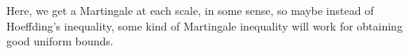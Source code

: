 \documentclass[dvipsnames,letterpaper,12pt]{article}
\numberwithin{equation}{section}
\DeclareMathOperator{\RR}{\mathbb{R}}
\DeclareMathOperator{\ZZ}{\mathbb{Z}}
\numberwithin{theorem}{section}
\DeclareMathOperator{\EE}{\mathbb{E}}
\begin{document}
\begin{comment}
Now the $L^p$ norm of the function
%
\[ N^{-k/p} \left( \sum_{i_1} e^{2 \pi i (M_{i_1} / N) x} \sum_{i_2} e^{2 \pi i (M_{i_1,i_2} / N^2) x} \dots \EE \left( \sum_{i_k} e^{2 \pi i (M_{i_1,\dots,i_k} / N^k) x} a_i \right) \right) \phi(x/N^k) \]
%
is bounded by
%
\[ C \cdot N^{-k/p} D_{k-1} \left( \sum_{i_1,\dots,i_{k-1}} \left\| \EE \left( \sum_{i_k} e^{2 \pi i (M_{i_1,\dots,i_k} / N^k) x} a_i \phi(x/2N) \right) \right\|_{L^p(\RR^d)}^2 \right)^{1/2} \]
%
which assuming $\sum |a_i|^2 = 1$, can be as bad as
%
\[ C \cdot N^{1-1/p} D_{k-1} M^{1/2}. \]
%
s

Now
%
\[ \EE \left[ e^{2 \pi i (M_{i_1,\dots,i_k} / N^k) x} \right] = \frac{1}{N} \sum_{j = 0}^{N-1} e^{2 \pi i (x/N^k) j} = (1/N) \frac{e^{2 \pi i x/N^{k-1}} - 1}{e^{2 \pi i x / N^k} - 1}. \]
%
This quantity becomes small when $d(x, N^{k-1} \ZZ) \lesssim N^{k-1}$, and large (on the scale of $O(1)$) when $x$ nears an integer multiple of $N^k$. Applying Cauchy-Schwartz, we conclude that
%
\[ \EE \left[ \sum_{i_k} e^{2 \pi i (M_{i_1,\dots,i_k} / N^k) x} a_{i_1,\dots,i_k} \right] = \frac{e^{2 \pi i x/N^{k-1}} - 1}{e^{2 \pi i x / N^k} - 1} \cdot \EE \left[ \sum_{i_k} a_{i_1,\dots,i_k} \right]. \]
%
In the worst case then, this expected value can be $O(N M^{1/2})$, and outside a set of total length $O(N^{k-1})$, it is likely to be on the other of $O(M^{1/2})$. Applying Hoeffding's inequality, if
%
\[ S_{i_1,\dots,i_{k-1}} = \sum_{i_k} e^{2 \pi i (M_{i_1,\dots,i_k} / N^k) x} a_{i_1,\dots,i_k}, \]
%
\end{comment}

\begin{comment}
Thus applying a union bound over all $i_1,\dots,i_{k-1}$, $S_{i_1,\dots,i_{k-1}}$ deviates from it's expected value by at most $O(\log M \cdot |a_{i_1,\dots,i_{k-1}}|)$ with high probability. Thus summing over $i_1,\dots,i_{k-1}$, we get a total error of
%
\[ O( \log M \sum_{i_1,\dots,i_{k-1}} |a_{i_1,\dots,i_{k-1}}| ) \]

we get that for each $i_1,\dots,i_{k-1}$,
%
\[ \| \sum_{i_k} e^{2 \pi i (M_{i_1,\dots,i_k} / N^k) x} a_{i_1,\dots,i_k} - \EE[] \|_{\psi_2} \lesssim \left( \sum \right)^{1/2} \]
\end{comment}


Here, we get a Martingale at each scale, in some sense, so maybe instead of Hoeffding's inequality, some kind of Martingale inequality will work for obtaining good uniform bounds.
\end{document}
